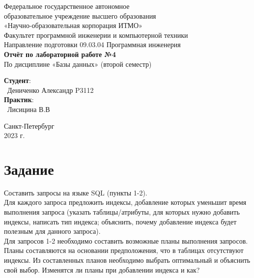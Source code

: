 \documentclass{article}
\begin{document}
\begin{center}
    \Large
    Федеральное государственное автономное \\
    образовательное учреждение высшего образования \\ 
    «Научно-образовательная корпорация ИТМО»\\
    \vspace{0.5cm}
    \large
    Факультет программной инженерии и компьютерной техники \\
    Направление подготовки 09.03.04 Программная инженерия \\
    \vspace{1cm}
    \Large
    \textbf{Отчёт по лабораторной работе №4} \\
    По дисциплине «Базы данных» (второй семестр)\\
    \large
    \vspace{8cm}

    \begin{minipage}{.33\textwidth}
    \end{minipage}
    \hfill
    \begin{minipage}{.4\textwidth}
    
        \textbf{Студент}: \vspace{.1cm} \\
        \ Дениченко Александр P3112\\
        \textbf{Практик}:  \\
        \ Лисицина В.В
    \end{minipage}
    \vfill
Санкт-Петербург\\ 2023 г.
\end{center}

\newpage

\section{Задание}
Составить запросы на языке SQL (пункты 1-2).
\\


Для каждого запроса предложить индексы, добавление которых уменьшит время выполнения запроса (указать таблицы/атрибуты, для которых нужно добавить индексы, написать тип индекса; объяснить, почему добавление индекса будет полезным для данного запроса).
\\


Для запросов 1-2 необходимо составить возможные планы выполнения запросов. Планы составляются на основании предположения, что в таблицах отсутствуют индексы. Из составленных планов необходимо выбрать оптимальный и объяснить свой выбор.
Изменятся ли планы при добавлении индекса и как?
\\
\end{document}
